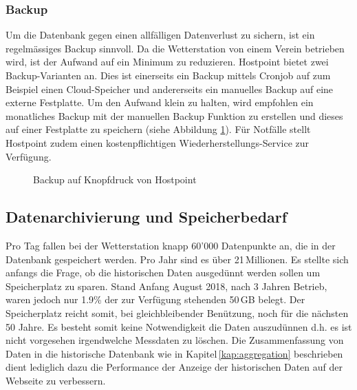 \subsubsection{Backup}
Um die Datenbank gegen einen allfälligen Datenverlust zu sichern, ist ein regelmässiges Backup sinnvoll. Da die Wetterstation von einem Verein betrieben wird, ist der Aufwand auf ein Minimum zu reduzieren. Hostpoint bietet zwei Backup-Varianten an. Dies ist einerseits ein Backup mittels Cronjob auf zum Beispiel einen Cloud-Speicher und andererseits ein manuelles Backup auf eine externe Festplatte. Um den Aufwand klein zu halten, wird empfohlen ein monatliches Backup mit der manuellen Backup Funktion zu erstellen und dieses auf einer Festplatte zu speichern (siehe Abbildung \ref{img:backup}). Für Notfälle stellt Hostpoint zudem einen kostenpflichtigen Wiederherstellungs-Service zur Verfügung.

\begin{figure}[htbp!]
	\centering
	\caption{Backup auf Knopfdruck von Hostpoint}
	\label{img:backup}
\end{figure}


\subsection{Datenarchivierung und Speicherbedarf}
Pro Tag fallen bei der Wetterstation knapp 60'000 Datenpunkte an, die in der Datenbank gespeichert werden. Pro Jahr sind es über 21\,Millionen. Es stellte sich anfangs die Frage, ob die historischen Daten ausgedünnt werden sollen um Speicherplatz zu sparen. Stand Anfang August 2018, nach 3 Jahren Betrieb, waren jedoch nur 1.9\% der zur Verfügung stehenden 50\,GB belegt. Der Speicherplatz reicht somit, bei gleichbleibender Benützung, noch für die nächsten 50 Jahre. Es besteht somit keine Notwendigkeit die Daten auszudünnen d.h. es ist nicht vorgesehen irgendwelche Messdaten zu löschen. Die Zusammenfassung von Daten in die historische Datenbank wie in Kapitel\,\ref{kap:aggregation} beschrieben dient lediglich dazu die Performance der Anzeige der historischen Daten auf der Webseite zu verbessern.


